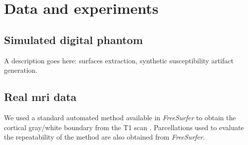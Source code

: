 \section*{Data and experiments}
\label{sec:experiments}

\subsection*{Simulated digital phantom} %
A description goes here: surfaces extraction, synthetic susceptibility artifact generation.

\subsection* {Real \gls{mri} data} %

We used a standard automated method
available in \emph{FreeSurfer} \citep{fischl_freesurfer_2012} to obtain the
cortical gray/white boundary from the T1 scan \citep{greve_accurate_2009}.
Parcellations used to evaluate the repeatability of the method are also
obtained from \emph{FreeSurfer}.


